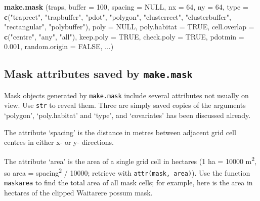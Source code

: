 \documentclass[
]{book}
\newenvironment{Shaded}{\begin{snugshade}}{\end{snugshade}}
\newcommand{\AttributeTok}[1]{\textcolor[rgb]{0.13,0.29,0.53}{#1}}
\newcommand{\ConstantTok}[1]{\textcolor[rgb]{0.56,0.35,0.01}{#1}}
\newcommand{\DecValTok}[1]{\textcolor[rgb]{0.00,0.00,0.81}{#1}}
\newcommand{\FloatTok}[1]{\textcolor[rgb]{0.00,0.00,0.81}{#1}}
\newcommand{\FunctionTok}[1]{\textcolor[rgb]{0.13,0.29,0.53}{\textbf{#1}}}
\newcommand{\NormalTok}[1]{#1}
\newcommand{\StringTok}[1]{\textcolor[rgb]{0.31,0.60,0.02}{#1}}
\begin{document}
\begin{Shaded}
\begin{Highlighting}[]
\FunctionTok{make.mask}\NormalTok{ (traps, }\AttributeTok{buffer =} \DecValTok{100}\NormalTok{, }\AttributeTok{spacing =} \ConstantTok{NULL}\NormalTok{, }\AttributeTok{nx =} \DecValTok{64}\NormalTok{, }\AttributeTok{ny =} \DecValTok{64}\NormalTok{,}
    \AttributeTok{type =} \FunctionTok{c}\NormalTok{(}\StringTok{"traprect"}\NormalTok{, }\StringTok{"trapbuffer"}\NormalTok{, }\StringTok{"pdot"}\NormalTok{, }\StringTok{"polygon"}\NormalTok{, }
    \StringTok{"clusterrect"}\NormalTok{, }\StringTok{"clusterbuffer"}\NormalTok{, }\StringTok{"rectangular"}\NormalTok{, }\StringTok{"polybuffer"}\NormalTok{),}
    \AttributeTok{poly =} \ConstantTok{NULL}\NormalTok{, }\AttributeTok{poly.habitat =} \ConstantTok{TRUE}\NormalTok{, }\AttributeTok{cell.overlap =} \FunctionTok{c}\NormalTok{(}\StringTok{"centre"}\NormalTok{,}
    \StringTok{"any"}\NormalTok{, }\StringTok{"all"}\NormalTok{), }\AttributeTok{keep.poly =} \ConstantTok{TRUE}\NormalTok{, }\AttributeTok{check.poly =} \ConstantTok{TRUE}\NormalTok{, }
    \AttributeTok{pdotmin =} \FloatTok{0.001}\NormalTok{, }\AttributeTok{random.origin =} \ConstantTok{FALSE}\NormalTok{, ...)}
\end{Highlighting}
\end{Shaded}

\subsection{\texorpdfstring{Mask attributes saved by \texttt{make.mask}}{Mask attributes saved by make.mask}}\label{mask-attributes-saved-by-make.mask}

Mask objects generated by \texttt{make.mask} include several attributes not usually on view. Use \texttt{str} to reveal them. Three are simply saved copies of the arguments `polygon', `poly.habitat' and `type', and `covariates' has been discussed already.

The attribute `spacing' is the distance in metres between adjacent grid cell centres in either x- or y- directions.

The attribute `area' is the area of a single grid cell in hectares (1 ha = 10000 m\textsuperscript{2}, so area = spacing\textsuperscript{2} / 10000; retrieve with \texttt{attr(mask,\ \textquotesingle{}area\textquotesingle{})}). Use the function \texttt{maskarea} to find the total area of all mask cells; for example, here is the area in hectares of the clipped Waitarere possum mask.
\end{document}
